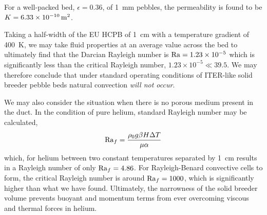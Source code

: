 For a well-packed bed, $\epsilon = 0.36$, of \SI{1}{\milli\meter} pebbles, the permeability is found to be $K = \SI{6.33E-10}{\meter\squared}$.

Taking a half-width of the EU HCPB of \SI{1}{\centi\meter} with a temperature gradient of \SI{400}{\kelvin}, we may take fluid properties at an average value across the bed to ultimately find that the Darcian Rayleigh number is $\mathrm{Ra} = \SI{1.23E-5}{}$ which is significantly less than the critical Rayleigh number, $1.23\times 10^{-5} \ll 39.5$. We may therefore conclude that under standard operating conditions of ITER-like solid breeder pebble beds natural convection \textit{will not occur}.

We may also consider the situation when there is no porous medium present in the duct. In the condition of pure helium, standard Rayleigh number may be calculated,
\begin{equation}
\mathrm{Ra}_f = \frac{\rho_0 g \beta H \Delta T}{\mu \alpha}
\end{equation}
which, for helium between two constant temperatures separated by \SI{1}{\centi\meter} results in a Rayleigh number of only $\mathrm{Ra}_f = 4.86$. For Rayleigh-Benard convective cells to form, the critical Rayleigh number is around $\mathrm{Ra}_f = 1000$, which is significantly higher than what we have found. Ultimately, the narrowness of the solid breeder volume prevents buoyant and momentum terms from ever overcoming viscous and thermal forces in helium.

